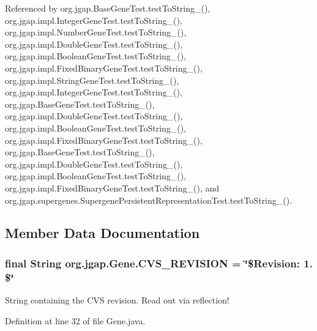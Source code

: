 Referenced by org.\-jgap.\-Base\-Gene\-Test.\-test\-To\-String\-\_(), org.\-jgap.\-impl.\-Integer\-Gene\-Test.\-test\-To\-String\-\_(), org.\-jgap.\-impl.\-Number\-Gene\-Test.\-test\-To\-String\-\_(), org.\-jgap.\-impl.\-Double\-Gene\-Test.\-test\-To\-String\-\_(), org.\-jgap.\-impl.\-Boolean\-Gene\-Test.\-test\-To\-String\-\_(), org.\-jgap.\-impl.\-Fixed\-Binary\-Gene\-Test.\-test\-To\-String\-\_(), org.\-jgap.\-impl.\-String\-Gene\-Test.\-test\-To\-String\-\_(), org.\-jgap.\-impl.\-Integer\-Gene\-Test.\-test\-To\-String\-\_(), org.\-jgap.\-Base\-Gene\-Test.\-test\-To\-String\-\_(), org.\-jgap.\-impl.\-Double\-Gene\-Test.\-test\-To\-String\-\_(), org.\-jgap.\-impl.\-Boolean\-Gene\-Test.\-test\-To\-String\-\_(), org.\-jgap.\-impl.\-Fixed\-Binary\-Gene\-Test.\-test\-To\-String\-\_(), org.\-jgap.\-Base\-Gene\-Test.\-test\-To\-String\-\_(), org.\-jgap.\-impl.\-Double\-Gene\-Test.\-test\-To\-String\-\_(), org.\-jgap.\-impl.\-Boolean\-Gene\-Test.\-test\-To\-String\-\_(), org.\-jgap.\-impl.\-Fixed\-Binary\-Gene\-Test.\-test\-To\-String\-\_(), and org.\-jgap.\-supergenes.\-Supergene\-Persistent\-Representation\-Test.\-test\-To\-String\-\_().



\subsection{Member Data Documentation}
\hypertarget{interfaceorg_1_1jgap_1_1_gene_a771652182ee68c96d4107eee7692fee2}{
\subsubsection[{C\-V\-S\-\_\-\-R\-E\-V\-I\-S\-I\-O\-N}]{\setlength{\rightskip}{0pt plus 5cm}final String org.\-jgap.\-Gene.\-C\-V\-S\-\_\-\-R\-E\-V\-I\-S\-I\-O\-N = \char`\"{}\$Revision\-: 1. \$\char`\"{}\hspace{0.3cm}{\ttfamily [static]}}}\label{interfaceorg_1_1jgap_1_1_gene_a771652182ee68c96d4107eee7692fee2}
String containing the C\-V\-S revision. Read out via reflection! 

Definition at line 32 of file Gene.\-java.


